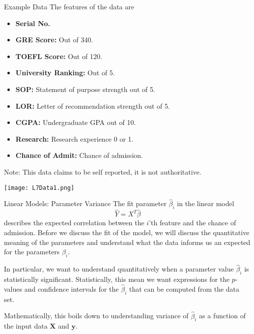 \documentclass[10pt, table, dvipsnames,xcdraw, handout ]{beamer}
\newcommand{\bfX}{\ensuremath{\mathbf{X}}}
\newcommand{\bfy}{\ensuremath{\mathbf{y}}}
\begin{document}
\begin{frame}[fragile]{Example Data}
The features of the data are

\begin{itemize}
\item[] \textbf{Serial No.} \pause
\item[] \textbf{GRE Score:} Out of 340.\pause
\item[] \textbf{TOEFL Score:} Out of 120. \pause
\item[] \textbf{University Ranking:} Out of 5.\pause
\item[] \textbf{SOP:} Statement of purpose strength out of 5.\pause
\item[] \textbf{LOR:} Letter of recommendation strength out of 5.\pause
\item[] \textbf{CGPA:} Undergraduate GPA out of 10.\pause
\item[] \textbf{Research:} Research experience 0 or 1.\pause
\item[] \textbf{Chance of Admit:} Chance of admission.\pause
\end{itemize}
Note: This data claims to be self reported, it is not authoritative. 


\end{frame}


\begin{frame}[fragile]
\vspace{1em}
	\centering \texttt{[image: L7Data1.png]} 
\end{frame}




\begin{frame}[fragile]{Linear Models: Parameter Variance}
The fit parameter $\hat \beta_i$ in the linear model 
$$
\hat Y = X^T\hat \beta
$$
describes the expected correlation between the $i$'th feature and the chance of admission. \pause Before we discuss the fit of the model, we will discuss the quantitative meaning of the parameters and understand what the data informs us an expected for the parameters $\hat \beta_i$. 

In particular, we want to understand quantitatively when a parameter value $\hat \beta_i$ is statistically significant. \pause Statistically, this mean we want expressions for the $p$-values and confidence intervals for the $\hat\beta_i$ that can be computed from the data set. \pause

Mathematically, this boils down to understanding variance of $\hat \beta_i$ as a function of the input data $\bfX$ and $\bfy$. 
\end{frame}
\end{document}

